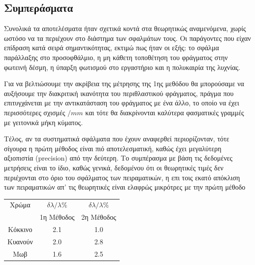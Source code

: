 \documentclass[a4paper]{article}
\begin{document}
\subsection*{Συμπεράσματα}
Συνολικά τα αποτελέσματα ήταν σχετικά κοντά στα θεωρητικώς αναμενόμενα, χωρίς ωστόσο να τα περιέχουν στο διάστημα των σφαλμάτων τους. Οι παράγοντες που είχαν επίδραση κατά σειρά σημαντικότητας, εκτιμώ πως ήταν οι εξής: 
  το σφάλμα παράλλαξης στο προσοφθάλμιο,
  η μη κάθετη τοποθέτηση του φράγματος στην φωτεινή δέσμη,
  η ύπαρξη φωτισμού στο εργαστήριο και 
  η πολυκαιρία της λυχνίας.

Για να βελτιώσουμε την ακρίβεια της μέτρησης της 1ης μεθόδου θα μπορούσαμε να αυξήσουμε την διακριτική ικανότητα του περιθλαστικού φράγματος, πράγμα που επιτυγχάνεται με την αντικατάσταση του φράγματος με ένα άλλο, το οποίο να έχει περισσότερες σχισμές $/mm$ και τότε θα διακρίνονται καλύτερα φασματικές γραμμές με γειτονικά μήκη κύματος.

Τέλος, αν τα συστηματικά σφάλματα που έχουν αναφερθεί περιορίζονταν, τότε σίγουρα η πρώτη μέθοδος είναι πιό αποτελεσματική, καθώς έχει μεγαλύτερη αξιοπιστία (precision) από την δεύτερη. Το συμπέρασμα με βάση τις δεδομένες μετρήσεις είναι το ίδιο, καθώς γενικά, δεδομένου ότι οι θεωρητικές τιμές δεν περιέχονται στο όριο του σφάλματος των πειραματικών, η επι τοις εκατό απόκλιση των πειραματικών απ' τις θεωρητικές είναι ελαφρώς μικρότρες με την πρώτη μέθοδο 
	
\begin{table}[h!]
\centering 
\begin{tabular}{c|c|c}
Χρώμα    & $\delta\lambda / \lambda \%$     & $\delta\lambda / \lambda \%$ \\ 
         &  1η Μέθοδος 						& 2η Μέθοδος 					\\ 
        \hline \hline
Κόκκινο  & 		2.1                           & 1.0 \\
Κυανούν  &  2.0 & 2.8 \\ 
Μωβ      & 1.6 & 2.5 
\end{tabular}
\end{table}
\end{document}
